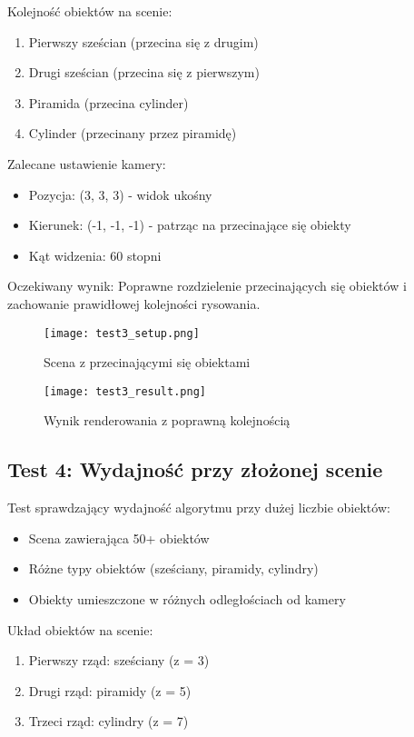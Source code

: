 \documentclass[a4paper,12pt]{article}
\begin{document}
Kolejność obiektów na scenie:
\begin{enumerate}
    \item Pierwszy sześcian (przecina się z drugim)
    \item Drugi sześcian (przecina się z pierwszym)
    \item Piramida (przecina cylinder)
    \item Cylinder (przecinany przez piramidę)
\end{enumerate}

Zalecane ustawienie kamery:
\begin{itemize}
    \item Pozycja: (3, 3, 3) - widok ukośny
    \item Kierunek: (-1, -1, -1) - patrząc na przecinające się obiekty
    \item Kąt widzenia: 60 stopni
\end{itemize}

Oczekiwany wynik: Poprawne rozdzielenie przecinających się obiektów i zachowanie prawidłowej kolejności rysowania.

\begin{figure}[h]
    \centering
    \begin{minipage}{0.48\textwidth}
        \centering
        \texttt{[image: test3\_setup.png]}
        \caption{Scena z przecinającymi się obiektami}
    \end{minipage}
    \hfill
    \begin{minipage}{0.48\textwidth}
        \centering
        \texttt{[image: test3\_result.png]}
        \caption{Wynik renderowania z poprawną kolejnością}
    \end{minipage}
\end{figure}

\subsection{Test 4: Wydajność przy złożonej scenie}
Test sprawdzający wydajność algorytmu przy dużej liczbie obiektów:
\begin{itemize}
    \item Scena zawierająca 50+ obiektów
    \item Różne typy obiektów (sześciany, piramidy, cylindry)
    \item Obiekty umieszczone w różnych odległościach od kamery
\end{itemize}

Układ obiektów na scenie:
\begin{enumerate}
    \item Pierwszy rząd: sześciany (z = 3)
    \item Drugi rząd: piramidy (z = 5)
    \item Trzeci rząd: cylindry (z = 7)
\end{enumerate}
\end{document}
